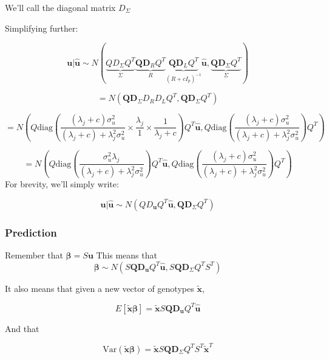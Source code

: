 We'll call the diagonal matrix \(D_\Sigma\)

Simplifying further:

$$\textbf{u}|\hat{\textbf{u}} \sim N(\underbrace{Q D_\Sigma Q^{T}}_\Sigma \underbrace{\textbf{Q}\textbf{D}_{R}Q^{T}}_R \underbrace{\textbf{Q}\textbf{D}_LQ^{T}}_{(R+cI_p)^{-1}}\hat{\textbf{u}},\underbrace{\textbf{Q}\textbf{D}_\Sigma Q^{T}}_\Sigma)$$

$$= N(\textbf{Q}\textbf{D}_\Sigma D_R D_LQ^{T},\textbf{Q}\textbf{D}_\Sigma Q^{T})$$

$$= N\left( Q \text{diag}\left( \frac{(\lambda_j+c)\sigma_u^2}{(\lambda_j+c)+\lambda_j^2\sigma_u^2} \times \frac{\lambda_j}{1} \times \frac{1}{\lambda_j+c} \right)Q^{T}\hat{\textbf{u}},Q \text{diag}\left(\frac{(\lambda_j+c)\sigma_u^2}{(\lambda_j+c)+\lambda_j^2\sigma_u^2} \right)Q^{T} \right)$$

$$= N\left( Q \text{diag}\left( \frac{\sigma_u^2 \lambda_j}{(\lambda_j+c)+\lambda_j^2\sigma_u^2}  \right)Q^{T}\hat{\textbf{u}},Q \text{diag}\left(\frac{(\lambda_j+c)\sigma_u^2}{(\lambda_j+c)+\lambda_j^2\sigma_u^2} \right)Q^{T} \right)$$
For brevity, we'll simply write:

$$\textbf{u}|\hat{\textbf{u}} \sim N \left(Q D_{\textbf{u}}Q^{T}\hat{\textbf{u}},\textbf{Q}\textbf{D}_{\Sigma}Q^{T}\right)$$




\subsubsection{Prediction}\label{sec:org8cfb0b1}

Remember that \(\boldsymbol{\beta}=S\textbf{u}\) This means that 
$$\boldsymbol{\beta} \sim N( S\textbf{Q}\textbf{D}_{\textbf{u}}Q^{T}\hat{\textbf{u}},S\textbf{Q}\textbf{D}_\Sigma Q^{T}S^{T})$$

It also means that given a new vector of genotypes \(\tilde{\textbf{x}}\),

$$E[\tilde{\textbf{x}}\boldsymbol{\beta}]=\tilde{\textbf{x}}S\textbf{Q}\textbf{D}_\textbf{u}Q^{T}\hat{\textbf{u}}$$

And that 

$$\text{Var}(\tilde{\textbf{x}}\boldsymbol{\beta})=\tilde{\textbf{x}}S\textbf{Q}\textbf{D}_\Sigma Q^{T}S^{T}\tilde{\textbf{x}}^{T}$$
